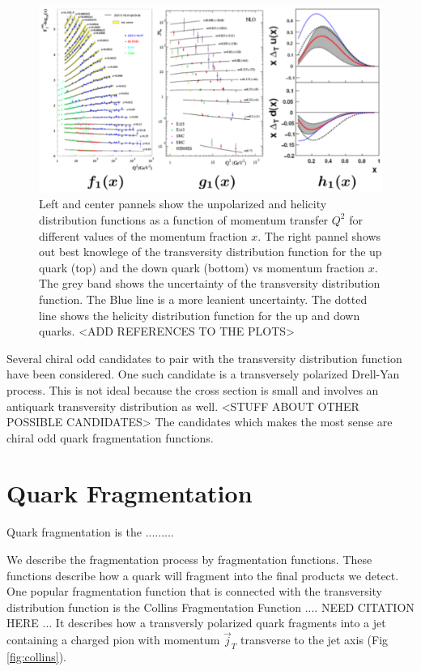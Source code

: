 \documentclass[abstract = on,listof=totoc, bibliography=totoc]{scrreprt}
\begin{document}
\begin{figure}
\begin{center}
\includegraphics[width = 1\textwidth]{pdfDistributions}
\caption[Current knowlege of parton distribution functions]{Left and center pannels show the unpolarized and helicity distribution functions as a function of momentum transfer $Q^2$ for different values of the momentum fraction $x$. The right pannel shows out best knowlege of the transversity distribution function for the up quark (top) and the down quark (bottom) vs momentum fraction $x$. The grey band shows the uncertainty of the transversity distribution function. The Blue line is a more leanient uncertainty. The dotted line shows the helicity distribution function for the up and down quarks. <ADD REFERENCES TO THE PLOTS>}
\label{fig:pdfDist}
\end{center}
\end{figure}

Several chiral odd candidates to pair with the transversity distribution function have been considered. One such candidate is a transversely polarized Drell-Yan process. This is not ideal because the cross section is small and involves an antiquark transversity distribution as well. <STUFF ABOUT OTHER POSSIBLE CANDIDATES> The candidates which makes the most sense are chiral odd quark fragmentation functions. 


  



\section{Quark Fragmentation}


Quark fragmentation is the .........

We describe the fragmentation process by fragmentation functions. These functions describe how a quark will fragment into the final products we detect. One popular fragmentation function that is connected with the transversity distribution function is the Collins Fragmentation Function .... NEED CITATION HERE ... It describes how a transversly polarized quark fragments into a jet containing a charged pion with momentum $\vec{j}_T$ transverse to the jet axis (Fig \ref{fig:collins}).  
\end{document}
